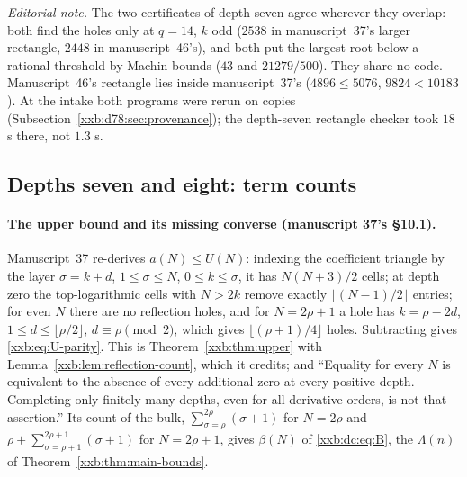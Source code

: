 \documentclass[11pt,a4paper]{article}
\numberwithin{equation}{section}
\theoremstyle{definition}
\theoremstyle{remark}
\theoremstyle{plain}
\begin{document}
\emph{Editorial note.}  The two certificates of depth seven agree wherever
they overlap: both find the holes only at $q=14$, $k$ odd ($2538$ in
manuscript~37's larger rectangle, $2448$ in manuscript~46's), and both put the
largest root below a rational threshold by Machin bounds ($43$ and
$21279/500$).  They share no code.  Manuscript~46's rectangle lies inside
manuscript~37's ($4896\le5076$, $9824<10183$).  At the intake both programs
were rerun on copies (Subsection~\ref{xxb:d78:sec:provenance}); the depth-seven
rectangle checker took $18$ s there, not $1.3$ s.

\subsection{Depths seven and eight: term counts}\label{xxb:d78:sec:counts}

\paragraph{The upper bound and its missing converse (manuscript 37's \S10.1).}
Manuscript~37 re-derives $a(N)\le U(N)$: indexing the coefficient triangle by
the layer $\sigma=k+d$, $1\le\sigma\le N$, $0\le k\le\sigma$, it has
$N(N+3)/2$ cells; at depth zero the top-logarithmic cells with $N>2k$ remove
exactly $\lfloor(N-1)/2\rfloor$ entries; for even $N$ there are no reflection
holes, and for $N=2\rho+1$ a hole has $k=\rho-2d$, $1\le d\le\lfloor\rho/2\rfloor$,
$d\equiv\rho\pmod2$, which gives $\lfloor(\rho+1)/4\rfloor$ holes.  Subtracting
gives \eqref{xxb:eq:U-parity}.  This is Theorem~\ref{xxb:thm:upper} with
Lemma~\ref{xxb:lem:reflection-count}, which it credits; and ``Equality for
every $N$ is equivalent to the absence of every additional zero at every
positive depth. Completing only finitely many depths, even for all derivative
orders, is not that assertion.''  Its count of the bulk, $\sum_{\sigma=\rho}^{2\rho}(\sigma+1)$
for $N=2\rho$ and $\rho+\sum_{\sigma=\rho+1}^{2\rho+1}(\sigma+1)$ for $N=2\rho+1$, gives
$\beta(N)$ of \eqref{xxb:dc:eq:B}, the $\Lambda(n)$ of
Theorem~\ref{xxb:thm:main-bounds}.
\end{document}
